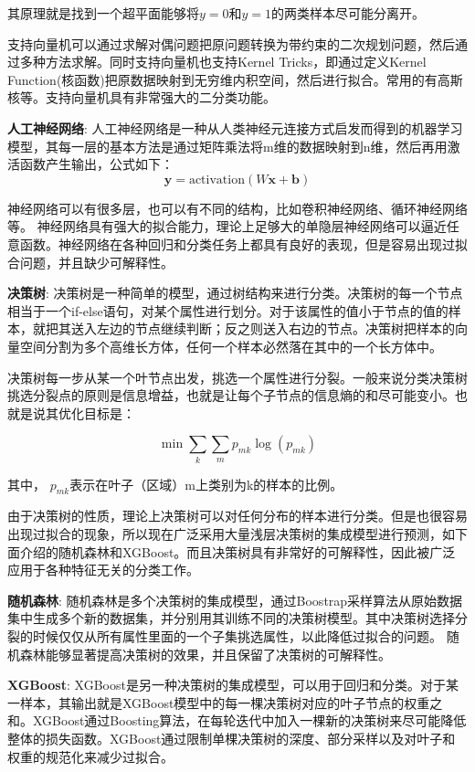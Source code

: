 其原理就是找到一个超平面能够将$y=0$和$y=1$的两类样本尽可能分离开。

支持向量机可以通过求解对偶问题把原问题转换为带约束的二次规划问题，然后通过多种方法求解。同时支持向量机也支持Kernel Tricks，即通过定义Kernel Function(核函数)把原数据映射到无穷维内积空间，然后进行拟合。常用的有高斯核等。支持向量机具有非常强大的二分类功能。

\textbf{人工神经网络}:
人工神经网络是一种从人类神经元连接方式启发而得到的机器学习模型，其每一层的基本方法是通过矩阵乘法将m维的数据映射到n维，然后再用激活函数产生输出，公式如下：
\[ \bm{y} = \text{activation}(W\bm{x} + \bm{b}) \]

神经网络可以有很多层，也可以有不同的结构，比如卷积神经网络、循环神经网络等。\cite{nndp} 神经网络具有强大的拟合能力，理论上足够大的单隐层神经网络可以逼近任意函数\cite{cybenko1989approximation}。神经网络在各种回归和分类任务上都具有良好的表现，但是容易出现过拟合问题，并且缺少可解释性。

\textbf{决策树}:
决策树\cite[311]{james2013introduction}是一种简单的模型，通过树结构来进行分类。决策树的每一个节点相当于一个if-else语句，对某个属性进行划分。对于该属性的值小于节点的值的样本，就把其送入左边的节点继续判断；反之则送入右边的节点。决策树把样本的向量空间分割为多个高维长方体，任何一个样本必然落在其中的一个长方体中。

决策树每一步从某一个叶节点出发，挑选一个属性进行分裂。一般来说分类决策树挑选分裂点的原则是信息增益，也就是让每个子节点的信息熵的和尽可能变小。也就是说其优化目标是：

\[ \min \sum_k \sum_m p_{mk}\log(p_{mk}) \]

其中， $p_{mk}$表示在叶子（区域）m上类别为k的样本的比例。

由于决策树的性质，理论上决策树可以对任何分布的样本进行分类。但是也很容易出现过拟合的现象，所以现在广泛采用大量浅层决策树的集成模型进行预测，如下面介绍的随机森林和XGBoost。而且决策树具有非常好的可解释性，因此被广泛应用于各种特征无关的分类工作。

\textbf{随机森林}:
随机森林\cite[320]{james2013introduction}是多个决策树的集成模型，通过Boostrap采样算法从原始数据集中生成多个新的数据集，并分别用其训练不同的决策树模型。其中决策树选择分裂的时候仅仅从所有属性里面的一个子集挑选属性，以此降低过拟合的问题。
随机森林能够显著提高决策树的效果，并且保留了决策树的可解释性。

\textbf{XGBoost}:
XGBoost\cite{chen2016xgboost}是另一种决策树的集成模型，可以用于回归和分类。对于某一样本，其输出就是XGBoost模型中的每一棵决策树对应的叶子节点的权重之和。XGBoost通过Boosting算法，在每轮迭代中加入一棵新的决策树来尽可能降低整体的损失函数。XGBoost通过限制单棵决策树的深度、部分采样以及对叶子和权重的规范化来减少过拟合。

